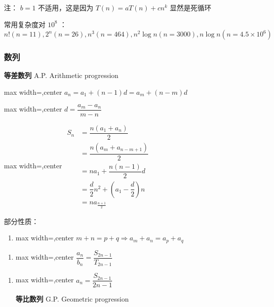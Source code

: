 \documentclass[twocolumn,10pt]{ctexart}
\begin{document}
注： $b=1$ 不适用，这是因为 $T(n)=aT(n)+cn^k$ 显然是死循环

常用复杂度对 $10^8$ ：$n!(n=11),\allowbreak{}2^n(n=26),\allowbreak{}n^3(n=464),\allowbreak{}n^2\log n(n=3000),\allowbreak{}n\log n(n=4.5\times10^6)$

\subsubsection{数列}

\textbf{等差数列} A.P.   Arithmetic progression

\begin{adjustbox}{max width=\linewidth,center}
$a_n=a_1+(n-1)d=a_m+(n-m)d$
\end{adjustbox}

\begin{adjustbox}{max width=\linewidth,center}
$d=\dfrac{a_m-a_n}{m-n}$
\end{adjustbox}

\begin{adjustbox}{max width=\linewidth,center}
$\begin{aligned}
S_n&=\dfrac{n(a_1+a_n)}2\\
&=\dfrac{n(a_m+a_{n-m+1})}2\\
&=na_1+\dfrac{n(n-1)}2d\\&=\dfrac d2n^2+(a_1-\dfrac d2)n\\&=na_{\frac{n+1}2}
\end{aligned}$
\end{adjustbox}

部分性质：

\begin{enumerate}
\item \begin{adjustbox}{max width=\linewidth,center}
$m+n=p+q\Rightarrow a_m+a_n=a_p+a_q$
\end{adjustbox}
\end{enumerate}

\begin{enumerate}
\item \begin{adjustbox}{max width=\linewidth,center}
$\dfrac{a_n}{b_n}=\dfrac{S_{2n-1}}{T_{2n-1}}$
\end{adjustbox}
\end{enumerate}

\begin{enumerate}
\item \begin{adjustbox}{max width=\linewidth,center}
$a_n=\dfrac{S_{2n-1}}{2n-1}$
\end{adjustbox}

\textbf{等比数列}  G.P.    Geometric progression
\end{enumerate}
\end{document}
